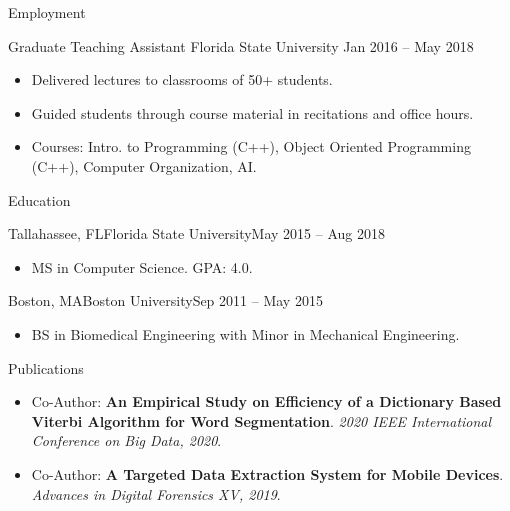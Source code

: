 \documentclass[]{mcdowellcv}
\begin{document}
\begin{cvsection}{Employment}
		\begin{cvsubsection} {Graduate Teaching Assistant} {Florida State University} {Jan 2016 -- May 2018}
			\begin{itemize}
				\item Delivered lectures to classrooms of 50+ students.
				\item Guided students through course material in recitations and office hours.
				\item Courses: Intro. to Programming (C++), Object Oriented Programming (C++), Computer Organization, AI.
			\end{itemize}
		\end{cvsubsection}
	\end{cvsection}
	
	\begin{cvsection}{Education}
		\begin{cvsubsection}{Tallahassee, FL}{Florida State University}{May 2015 -- Aug 2018}
			\begin{itemize}
				\item MS in Computer Science. GPA: 4.0.
			\end{itemize}
		\end{cvsubsection}
		
		\begin{cvsubsection}{Boston, MA}{Boston University}{Sep 2011 -- May 2015}
			\begin{itemize}
				\item BS in Biomedical Engineering with Minor in Mechanical Engineering.
			\end{itemize}
		\end{cvsubsection}
	\end{cvsection}

	\begin{cvsection}{Publications}
		\begin{cvsubsection}{}{}{}	
			\begin{itemize}
				\item Co-Author: \textbf{An Empirical Study on Efficiency of a Dictionary Based Viterbi Algorithm for Word Segmentation}. \textit{2020 IEEE International Conference on Big Data, 2020}.
				\item Co-Author: \textbf{A Targeted Data Extraction System for Mobile Devices}. \textit{Advances in Digital Forensics XV, 2019}.
			\end{itemize}
		\end{cvsubsection}
	\end{cvsection}
	
\end{document}
